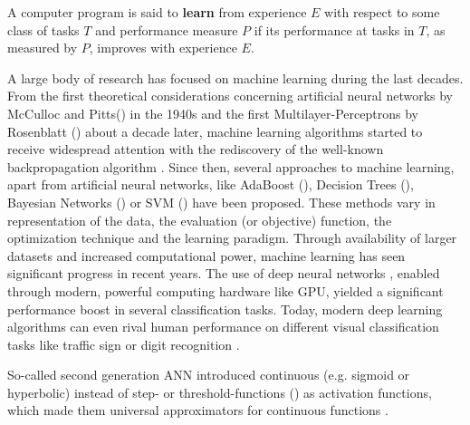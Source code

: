 \begin{defn}
	A computer program is said to \textbf{learn} from experience $E$ with respect to some class of tasks $T$ and performance measure $P$ if its performance at tasks in $T$, as measured by $P$, improves with experience $E$.
\end{defn}
A large body of research has focused on machine learning during the last decades.
From the first theoretical considerations concerning artificial neural networks by McCulloc and Pitts() in the 1940s and the first Multilayer-Perceptrons by Rosenblatt () about a decade later, machine learning algorithms started to receive widespread attention with the rediscovery \cite{Rumelhart1988} of the well-known backpropagation algorithm \cite{Werbos1974}.
Since then, several approaches to machine learning, apart from artificial neural networks, like AdaBoost (), Decision Trees (), Bayesian Networks () or \ac{SVM} () have been proposed.
These methods vary in representation of the data, the evaluation (or objective) function, the optimization technique and the learning paradigm.
Through availability of larger datasets and increased computational power, machine learning has seen significant progress in recent years.
The use of deep neural networks \cite{Schmidhuber2015}, enabled through modern, powerful computing hardware like \ac{GPU}, yielded a significant performance boost in several classification tasks. 
Today, modern deep learning algorithms can even rival human performance on different visual classification tasks like traffic sign \cite{Ciresan2012} or digit recognition \cite{Ciresan2012a}.

So-called second generation \ac{ANN} introduced continuous (e.g. sigmoid or hyperbolic) instead of step- or threshold-functions () as activation functions, which made them universal approximators for continuous functions \cite{Cybenko1989}.

